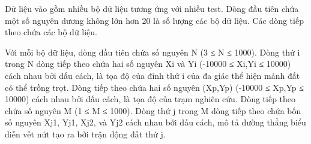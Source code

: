 Dữ liệu vào gồm nhiều bộ dữ liệu tương ứng với nhiều test. Dòng đầu tiên chứa một số nguyên dương không lớn hơn 20 là số lượng các bộ dữ liệu. Các dòng tiếp theo chứa các bộ dữ liệu.  

   Với mỗi bộ dữ liệu, dòng đầu tiên chứa số nguyên N (3 ≤  N ≤  1000). Dòng thứ i trong N dòng tiếp theo chứa hai số nguyên Xi và Yi (-10000 ≤ Xi,Yi ≤ 10000) cách nhau bởi dấu cách, là tọa độ của đỉnh thứ i của đa giác thể hiện mảnh đất có thể trồng trọt. Dòng tiếp theo chứa hai số nguyên (Xp,Yp) (-10000 ≤ Xp,Yp ≤ 10000) cách nhau bởi dấu cách, là tọa độ của trạm nghiên cứu. Dòng tiếp theo chứa số nguyên M (1 ≤ M ≤ 1000). Dòng thứ j trong M dòng tiếp theo chứa bốn số nguyên Xj1, Yj1, Xj2, và Yj2 cách nhau bởi dấu cách, mô tả đường thẳng biểu diễn vết nứt tạo ra bởi trận động đất thứ j.
